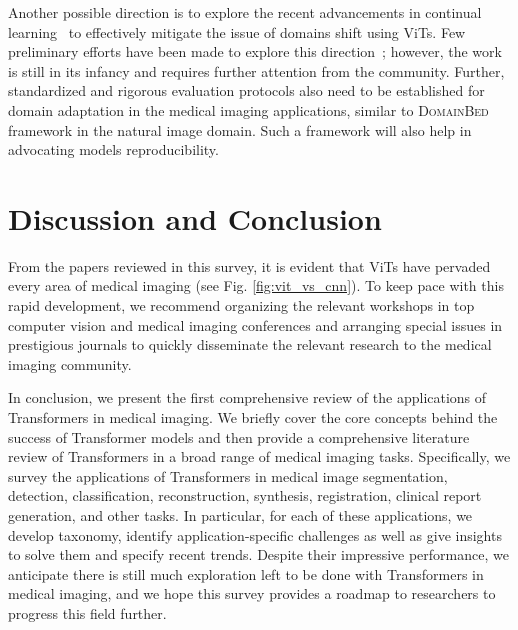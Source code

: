 \documentclass[10pt,journal,compsoc]{IEEEtran}
\begin{document}
Another possible direction is to explore the recent advancements in continual learning~\cite{qu2021recent} to effectively mitigate the issue of domains shift using ViTs. Few preliminary efforts have been made to explore this direction~\cite{lenga2020continual}; however, the work is still in its infancy and requires further attention from the community.
Further, standardized and rigorous evaluation protocols also need to be established for domain adaptation in the medical imaging applications, similar to \textsc{DomainBed}~\cite{gulrajani2020search} framework in the natural image domain. Such a framework will also help in advocating models reproducibility.

\section{Discussion and Conclusion} \label{sec:conc}
From the papers reviewed in this survey, it is evident that ViTs have pervaded every area of medical imaging (see Fig. \ref{fig:vit_vs_cnn}). To keep pace with this rapid development, we recommend organizing the relevant workshops in top computer vision and medical imaging conferences and arranging special issues in prestigious journals to quickly disseminate the relevant research to the medical imaging community.

In conclusion, we present the first comprehensive review of the applications of Transformers in medical imaging. We briefly cover the core concepts behind the success of Transformer models and then provide a comprehensive literature review of Transformers in a broad range of medical imaging tasks. Specifically, we survey the applications of Transformers in medical image segmentation, detection, classification, reconstruction, synthesis, registration, clinical report generation, and other tasks. In particular, for each of these applications, we develop taxonomy, identify application-specific challenges as well as give insights to solve them and specify recent trends. %
Despite their impressive performance, we anticipate there is still much exploration left to be done with Transformers in medical imaging, and we hope this survey provides a roadmap to researchers to progress this field further.
\end{document}
